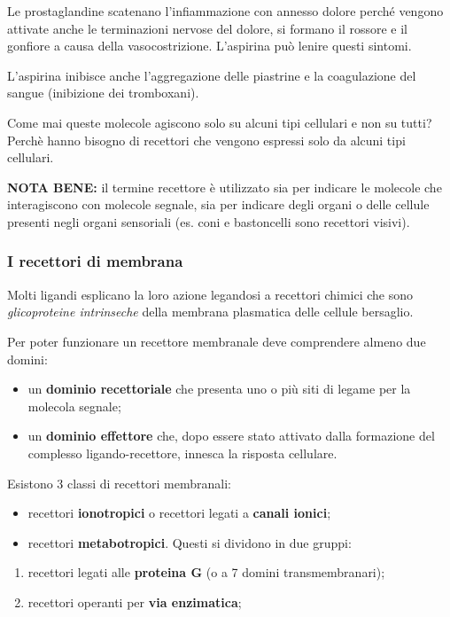 \documentclass[]{article}
\begin{document}
Le prostaglandine scatenano l'infiammazione con annesso dolore perché
vengono attivate anche le terminazioni nervose del dolore, si formano il
rossore e il gonfiore a causa della vasocostrizione. L'aspirina può
lenire questi sintomi.

L'aspirina inibisce anche l'aggregazione delle piastrine e la
coagulazione del sangue (inibizione dei tromboxani).

Come mai queste molecole agiscono solo su alcuni tipi cellulari e non su
tutti? Perchè hanno bisogno di recettori che vengono espressi solo da
alcuni tipi cellulari.

\textbf{NOTA BENE:} il termine recettore è utilizzato sia per indicare
le molecole che interagiscono con molecole segnale, sia per indicare
degli organi o delle cellule presenti negli organi sensoriali (es. coni
e bastoncelli sono recettori visivi).

\subsubsection{I recettori di membrana}\label{i-recettori-di-membrana}

Molti ligandi esplicano la loro azione legandosi a recettori chimici che
sono \emph{glicoproteine intrinseche} della membrana plasmatica delle
cellule bersaglio.

Per poter funzionare un recettore membranale deve comprendere almeno due
domini:

\begin{itemize}
\itemsep1pt\parskip0pt
\item
  un \textbf{dominio recettoriale} che presenta uno o più siti di legame
  per la molecola segnale;
\item
  un \textbf{dominio effettore} che, dopo essere stato attivato dalla
  formazione del complesso ligando-recettore, innesca la risposta
  cellulare.
\end{itemize}

Esistono 3 classi di recettori membranali:

\begin{itemize}
\itemsep1pt\parskip0pt
\item
  recettori \textbf{ionotropici} o recettori legati a \textbf{canali
  ionici};
\item
  recettori \textbf{metabotropici}. Questi si dividono in due gruppi:
\end{itemize}

\begin{enumerate}
\def\labelenumi{\arabic{enumi}.}
\itemsep1pt\parskip0pt
\item
  recettori legati alle \textbf{proteina G} (o a 7 domini
  transmembranari);
\item
  recettori operanti per \textbf{via enzimatica};
\end{enumerate}
\end{document}
